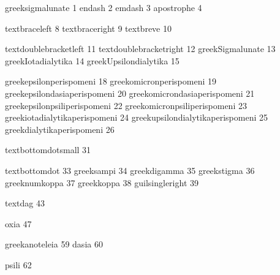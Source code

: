 
\startencoding[agr]

 greeksigmalunate                    1
 endash                              2
 emdash                              3
 apostrophe                          4

 textbraceleft                       8
 textbraceright                      9
 textbreve                          10

 textdoublebracketleft              11
 textdoublebracketright             12
 greekSigmalunate                   13
 greekIotadialytika                 14
 greekUpsilondialytika              15

 greekepsilonperispomeni            18
 greekomicronperispomeni            19
 greekepsilondasiaperispomeni       20
 greekomicrondasiaperispomeni       21
 greekepsilonpsiliperispomeni       22
 greekomicronpsiliperispomeni       23
 greekiotadialytikaperispomeni      24
 greekupsilondialytikaperispomeni   25
 greekdialytikaperispomeni          26

 textbottomdotsmall                 31

 textbottomdot                      33
 greeksampi                         34
 greekdigamma                       35
 greekstigma                        36
 greeknumkoppa                      37
 greekkoppa                         38
 guilsingleright                    39

 textdag                            43

 oxia                               47

 greekanoteleia			            59
 dasia                              60

 psili                              62


